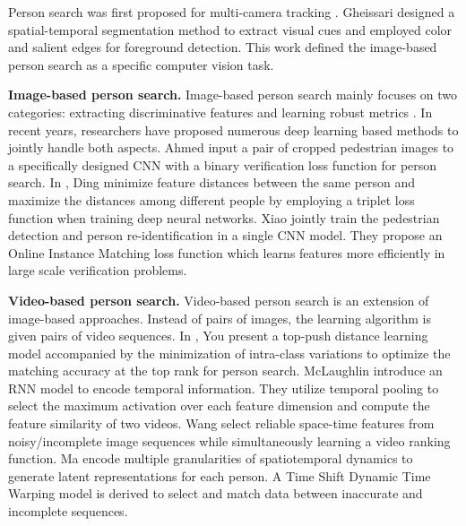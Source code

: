 Person search was first proposed for multi-camera tracking \cite{wang2013intelligent,shen2014multihuman}. Gheissari \etal \cite{gheissari2006person} designed a spatial-temporal segmentation method to extract visual cues and employed color and salient edges for foreground detection. This work defined the image-based person search as a specific computer vision task. 

\textbf{Image-based person search.} Image-based person search mainly focuses on two categories: extracting discriminative features \cite{gray2008viewpoint,farenzena2010person,ma2012local,kviatkovsky2013color,xiao2016end} and learning robust metrics \cite{prosser2010person,zheng2011person,koestinger2012large,pedagadi2013local,bakone}. In recent years, researchers have proposed numerous deep learning based methods \cite{ahmed2015improved,li2014deepreid,ding2015deep,li2017learning,xiao2017joint} to jointly handle both aspects. Ahmed \etal \cite{ahmed2015improved} input a pair of cropped pedestrian images to a specifically designed CNN with a binary verification loss function for person search. In \cite{ding2015deep}, Ding \etal minimize feature distances between the same person and maximize the distances among different people by employing a triplet loss function when training deep neural networks. Xiao \etal \cite{xiao2017joint} jointly train the pedestrian detection and person re-identification in a single CNN model. They propose an Online Instance Matching loss function which learns features more efficiently in large scale verification problems.

\textbf{Video-based person search.} Video-based person search \cite{mclaughlin2016recurrent,zhousee,you2016top,wang2014person,zhu2016video,ma2017person} is an extension of  image-based approaches.  Instead of pairs of images, the learning algorithm is given pairs of video sequences. In \cite{you2016top}, You \etal present a top-push distance learning model accompanied by the minimization of intra-class variations to optimize the matching accuracy at the top rank for person search. McLaughlin \etal \cite{mclaughlin2016recurrent} introduce an RNN model to encode temporal information. They utilize temporal pooling to select the maximum activation over each feature dimension and compute the feature similarity of two videos. Wang \etal \cite{wang2014person} select reliable space-time features from noisy/incomplete image sequences while simultaneously learning a video ranking function. Ma \etal \cite{ma2017person} encode multiple granularities of spatiotemporal dynamics to generate latent representations for each person. A Time Shift Dynamic Time Warping model is derived to select and match data between inaccurate and incomplete sequences.

